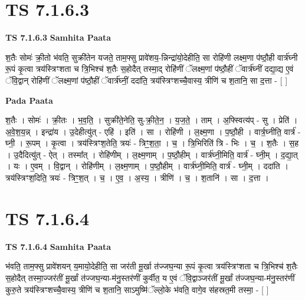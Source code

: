\documentclass[17pt]{extarticle}
\begin{document}
\section*{ TS 7.1.6.3 }

\textbf{TS 7.1.6.3 } \newline
\textbf{Samhita Paata} \newline

श॒तैः सोमः॑ क्री॒तो भ॑वति॒ सुक्री॑तेन यजते॒ ताम॒फ्सु प्रावे॑शय॒-न्निन्द्रा॑यो॒देहीति॒ सा रोहि॑णी लक्ष्म॒णा प॑ष्ठौ॒ही वार्त्र॑घ्नी रू॒पं कृ॒त्वा त्रय॑स्त्रिꣳशता च त्रि॒भिश्च॑ श॒तैः स॒होदैत् तस्मा॒द् रोहि॑णीं ॅलक्ष्म॒णां प॑ष्ठौ॒हीं ॅवार्त्र॑घ्नीं दद्या॒द्य ए॒वं ॅवि॒द्वान् रोहि॑णीं ॅलक्ष्म॒णां प॑ष्ठौ॒हीं ॅवार्त्र॑घ्नीं॒ ददा॑ति॒ त्रय॑स्त्रिꣳशच्चै॒वास्य॒ त्रीणि॑ च श॒तानि॒ सा द॒त्ता - [  ] \newline

\textbf{Pada Paata} \newline

श॒तैः । सोमः॑ । क्री॒तः । भ॒व॒ति॒ । सुक्री॑ते॒नेति॒ सु-क्री॒ते॒न॒ । य॒ज॒ते॒ । ताम् । अ॒फ्स्वित्य॑प् - सु । प्रेति॑ । अ॒वे॒श॒य॒न्न् । इन्द्रा॑य । उ॒देहीत्यु॑त् - एहि॑ । इति॑ । सा । रोहि॑णी । ल॒क्ष्म॒णा । प॒ष्ठौ॒ही । वार्त्र॒घ्नीति॒ वार्त्र॑ - घ्नी॒ । रू॒पम् । कृ॒त्वा । त्रय॑स्त्रिꣳश॒तेति॒ त्रयः॑ - त्रिꣳ॒॒श॒ता॒ । च॒ । त्रि॒भिरिति॑ त्रि - भिः । च॒ । श॒तैः । स॒ह । उ॒दैदित्यु॑त् - ऐत् । तस्मा᳚त् । रोहि॑णीम् । ल॒क्ष्म॒णाम् । प॒ष्ठौ॒हीम् । वार्त्र॑घ्नी॒मिति॒ वार्त्र॑ - घ्नी॒म् । द॒द्या॒त् । यः । ए॒वम् । वि॒द्वान् । रोहि॑णीम् । ल॒क्ष्म॒णाम् । प॒ष्ठौ॒हीम् । वार्त्र॑घ्नी॒मिति॒ वार्त्र॑ - घ्नी॒म् । ददा॑ति । त्रय॑स्त्रिꣳश॒दिति॒ त्रयः॑ - त्रिꣳ॒॒श॒त् । च॒ । ए॒व॒ । अ॒स्य॒ । त्रीणि॑ । च॒ । श॒तानि॑ । सा । द॒त्ता ।  \newline




\section*{ TS 7.1.6.4 }

\textbf{TS 7.1.6.4 } \newline
\textbf{Samhita Paata} \newline

भ॑वति॒ ताम॒फ्सु प्रावे॑शयन् य॒मायो॒देहीति॒ सा जर॑ती मू॒र्खा त॑ज्जघ॒न्या रू॒पं कृ॒त्वा त्रय॑स्त्रिꣳशता च त्रि॒भिश्च॑ श॒तैः स॒होदैत् तस्मा॒ज्जर॑तीं मू॒र्खां त॑ज्जघ॒न्या-म॑नु॒स्तर॑णीं कुर्वीत॒ य ए॒वं ॅवि॒द्वाञ्जर॑तीं मू॒र्खां त॑ज्जघ॒न्या-म॑नु॒स्तर॑णीं कुरु॒ते त्रय॑स्त्रिꣳशच्चै॒वास्य॒ त्रीणि॑ च श॒तानि॒ साऽमुष्मि॑ॅल्लो॒के भ॑वति॒ वागे॒व स॑हस्रत॒मी तस्मा॒ - [  ] \newline
\end{document}
